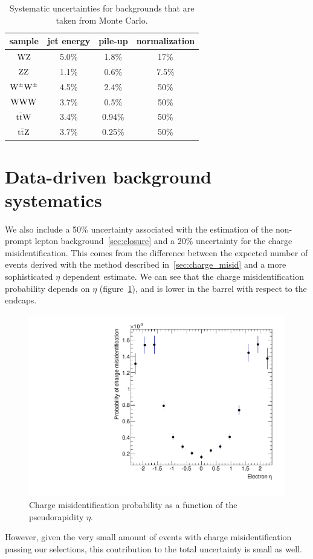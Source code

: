 \begin{table}[htb]
    \centering
\begin{tabular}{*4c}
    \toprule
    sample       &    jet energy & pile-up & normalization \\
    \midrule
$\mathrm{W}\mathrm{Z}$             & 5.0\%  & 1.8\%  & 17\%    \\
$\mathrm{Z}\mathrm{Z}$             & 1.1\%  & 0.6\%  & 7.5\% \\
$\mathrm{W}^{\pm}\mathrm{W}^{\pm}$ & 4.5\%  & 2.4\%  & 50\% \\
$\mathrm{W}\mathrm{W}\mathrm{W}$            & 3.7\%  & 0.5\%  & 50\% \\
$\mathrm{t}\bar{\mathrm{t}} \mathrm{W}$       & 3.4\%  & 0.94\% & 50\% \\
$\mathrm{t}\bar{\mathrm{t}} \mathrm{Z}$       & 3.7\%  & 0.25\% & 50\% \\
\bottomrule
\end{tabular}
\caption{Systematic uncertainties for backgrounds that are taken from Monte Carlo.}
\label{tab:MConlySystematics}
\end{table}

\section{Data-driven background systematics}
We also include a 50\% uncertainty associated with the
estimation of the non-prompt lepton background~\ref{sec:closure}
and a 20\% uncertainty for the charge misidentification. This comes from the
difference between the expected number of events derived with the method
described in~\ref{sec:charge_misid} and a more sophisticated $\eta$
dependent estimate. We can see that the charge misidentification probability
depends on $\eta$ (figure~\ref{fig:charge_misid_eta}), and is lower in the
barrel with respect to the endcaps.
\begin{figure}[htb]
    \centering
    \includegraphics[width=.7\textwidth]{images/pdf/h_MisIDProbvsEta}

    \caption{Charge misidentification probability as a function of the
    pseudorapidity $\eta$.}
    \label{fig:charge_misid_eta}
\end{figure}
However, given the very small amount of events with charge misidentification
passing our selections, this contribution to the total uncertainty is small
as well.

